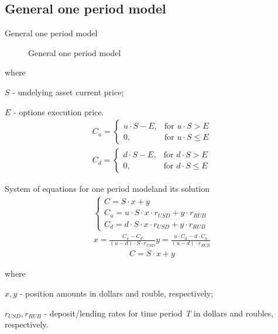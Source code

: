 \documentclass[_international_finance_p1.tex]{subfiles}
\begin{document}
\subsection{General one period model}
\begin{frame}[shrink=15]{General one period model}
\begin{figure}
	\center
	\begin{overprint}
	\end{overprint}
	\caption{General one period model}
\end{figure}

where

$S$ - undelying asset current price;

$E$ - options execution price.
\begin{align}
C_u = \begin{cases} u \cdot S - E, & \mbox{for } u \cdot S > E \\ 
0, & \mbox{for } u \cdot S \leq E \end{cases}\\
C_d = \begin{cases} d \cdot S - E, & \mbox{for } d \cdot S > E \\ 
0, & \mbox{for } d \cdot S \leq E \end{cases}
\end{align}
\end{frame}
\begin{frame}[shrink=15]{System of equations for one period model}{and its solution}
\begin{align}
\begin{cases} 
C = S \cdot x + y\\ 
C_u = u \cdot S \cdot x \cdot r_{USD} + y \cdot r_{RUB}\\
C_d = d \cdot S \cdot x \cdot r_{USD} + y \cdot r_{RUB}
\end{cases}\\[12pt]
x=\frac{C_u-C_d}{(u-d)\cdot S \cdot r_{USD}}
y=\frac{u \cdot C_d-d \cdot C_u}{(u-d) \cdot r_{RUB}}
\end{align}
\begin{align}
C = S \cdot x + y
\end{align}

where

$x, y$ - position amounts in dollars and rouble, respectively;

$r_{USD},r_{RUB}$ - deposit/lending rates for time period \textit{T} in dollars and roubles, respectively.
\end{frame}
\end{document}
